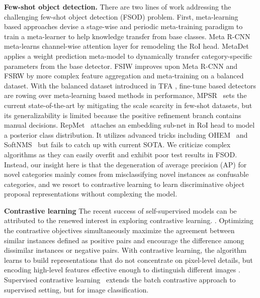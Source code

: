 \documentclass[final]{cvpr}
\begin{document}
\textbf{Few-shot object detection.} There are two lines of work addressing the challenging few-shot object detection (FSOD) problem. First, meta-learning based approaches devise a stage-wise and periodic meta-training paradigm to train a meta-learner to help knowledge transfer from base classes. Meta R-CNN \cite{yan_meta_2020} meta-learns channel-wise attention layer for remodeling the RoI head. MetaDet \cite{wang_meta-learning_2019} applies a weight prediction meta-model to dynamically transfer category-specific parameters from the base detector. FSIW \cite{xiao_few_shot_2020} improves upon Meta R-CNN and FSRW \cite{kang_few-shot_2019} by more complex feature aggregation and meta-training on a balanced dataset. With the balanced dataset introduced in TFA \cite{wang_frustratingly_2020}, fine-tune based detectors are rowing over meta-learning based methods in performance, MPSR~\cite{wu_multi-scale_2020} sets the current state-of-the-art by mitigating the scale scarcity in few-shot datasets, but its generalizability is limited because the positive refinement branch contains manual decisions. RepMet~\cite{karlinsky_repmet_2018} attaches an embedding sub-net in RoI head to model a posterior class distribution. It utilizes advanced tricks including OHEM~\cite{shrivastava_training_2016} and SoftNMS~\cite{bodla_soft-nms_2017} but fails to catch up with current SOTA. We criticize complex algorithms as they can easily overfit and exhibit poor test results in FSOD. Instead, our insight here is that the degeneration of average precision (AP) for novel categories mainly comes from misclassifying novel instances as confusable categories, and we resort to contrastive learning to learn discriminative object proposal representations without complexing the model.


\textbf{Contrastive learning}
The recent success of self-supervised models can be attributed to the renewed interest in exploring contrastive learning. \cite{hjelm_learning_2018,wu_unsupervised_2018,oord_representation_2019,chuang_debiased_2020,he_momentum_2020,chen_improved_2020,chen_simple_2020,chen_big_2020}. Optimizing the contrastive objectives \cite{oord_representation_2019,cos_face,deng_arcface_2019,supervised_contrastive_learning} simultaneously maximize the agreement between similar instances defined as positive pairs and encourage the difference among dissimilar instances or negative pairs. With contrastive learning, the algorithm learns to build representations that do not concentrate on pixel-level details, but encoding high-level features effective enough to distinguish different images \cite{chen_simple_2020,he_momentum_2020,chen_improved_2020,chen_big_2020}. Supervised contrastive learning~\cite{supervised_contrastive_learning} extends the batch contrastive approach to supervised setting, but for image classification. 
\end{document}
